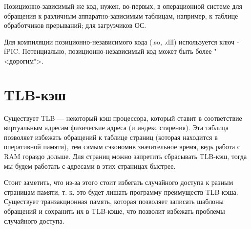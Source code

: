 \documentclass[main]{subfiles}
\begin{document}
Позиционно-зависимый же код, нужен, во-первых, в операционной системе для
обращения к различным аппаратно-зависимым таблицам, например, к таблице
обработчиков прерываний; для загрузчиков ОС.

Для компиляции позиционно-независимого кода (.so, .dll) используется ключ
-fPIC. Потенциально, позиционно-независимый код может быть более "<дорогим">.

\section{TLB-кэш}
Существует TLB --- некоторый кэш процессора, который ставит в соответствие
виртуальным адресам физические адреса (и индекс старения).
Эта таблица позволяет избежать
обращений к таблице страниц (которая находится в оперативной памяти), тем
самым сэкономив значительное время, ведь работа с RAM гораздо дольше.
Для страниц можно запретить сбрасывать TLB-кэш, тогда мы будем работать с
адресами в этих страницах быстрее.

Стоит заметить, что из-за этого стоит избегать случайного доступа к разным
страницам памяти, т. к. это будет лишать программу преимуществ TLB-кэша.
Существует транзакционная память, которая позволяет записать шаблоны обращений
и сохранить их в TLB-кэше, что позволит избежать проблемы случайного доступа.
\end{document}
